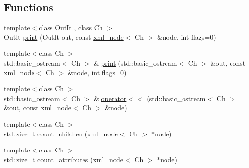 \subsection*{Functions}
\begin{DoxyCompactItemize}
\item 
{\footnotesize template$<$class Out\+It , class Ch $>$ }\\Out\+It \mbox{\hyperlink{namespacerapidxml_a0fb0be6eba49fb2e2646d5a72a0dc355}{print}} (Out\+It out, const \mbox{\hyperlink{classrapidxml_1_1xml__node}{xml\+\_\+node}}$<$ Ch $>$ \&node, int flags=0)
\item 
{\footnotesize template$<$class Ch $>$ }\\std\+::basic\+\_\+ostream$<$ Ch $>$ \& \mbox{\hyperlink{namespacerapidxml_a0d2e114d5dd85e13c23b8dab600720fe}{print}} (std\+::basic\+\_\+ostream$<$ Ch $>$ \&out, const \mbox{\hyperlink{classrapidxml_1_1xml__node}{xml\+\_\+node}}$<$ Ch $>$ \&node, int flags=0)
\item 
{\footnotesize template$<$class Ch $>$ }\\std\+::basic\+\_\+ostream$<$ Ch $>$ \& \mbox{\hyperlink{namespacerapidxml_a9ed8e626dd81348caede1f92a6c8418a}{operator$<$$<$}} (std\+::basic\+\_\+ostream$<$ Ch $>$ \&out, const \mbox{\hyperlink{classrapidxml_1_1xml__node}{xml\+\_\+node}}$<$ Ch $>$ \&node)
\item 
{\footnotesize template$<$class Ch $>$ }\\std\+::size\+\_\+t \mbox{\hyperlink{namespacerapidxml_a21c1cf2814019385e6b8d09e75af1d34}{count\+\_\+children}} (\mbox{\hyperlink{classrapidxml_1_1xml__node}{xml\+\_\+node}}$<$ Ch $>$ $\ast$node)
\item 
{\footnotesize template$<$class Ch $>$ }\\std\+::size\+\_\+t \mbox{\hyperlink{namespacerapidxml_a6255d15e5d8ad12ebcd7c60da51c97e2}{count\+\_\+attributes}} (\mbox{\hyperlink{classrapidxml_1_1xml__node}{xml\+\_\+node}}$<$ Ch $>$ $\ast$node)
\end{DoxyCompactItemize}
